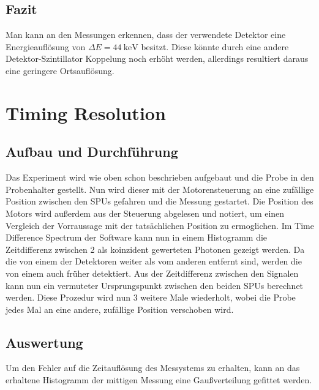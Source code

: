 \documentclass[12pt,twoside,a4paper]{scrartcl}
\begin{document}
\subsection{Fazit}

		Man kann an den Messungen erkennen, dass der verwendete Detektor eine Energieauflösung von $\Delta E = \SI{44}{\kilo \electronvolt}$ besitzt. Diese könnte durch eine andere Detektor-Szintillator Koppelung noch erhöht werden, allerdings resultiert daraus eine geringere Ortsauflösung.

		\section{Timing Resolution}

			\subsection{Aufbau und Durchführung}
				Das Experiment wird wie oben schon beschrieben aufgebaut und die Probe in den Probenhalter gestellt. Nun wird dieser mit der Motorensteuerung an eine zufällige Position zwischen den SPUs gefahren und die Messung gestartet. Die Position des Motors wird außerdem aus der Steuerung abgelesen und notiert, um einen Vergleich der Vorraussage mit der tatsächlichen Position zu ermoglichen. Im Time Difference Spectrum der Software kann nun in einem Histogramm die Zeitdifferenz zwischen 2 als koinzident gewerteten Photonen gezeigt werden. Da die von einem der Detektoren weiter als vom anderen entfernt sind, werden die von einem auch früher detektiert. Aus der Zeitdifferenz zwischen den Signalen kann nun ein vermuteter Ursprungspunkt zwischen den beiden SPUs berechnet werden. Diese Prozedur wird nun 3 weitere Male wiederholt, wobei die Probe jedes Mal an eine andere, zufällige Position verschoben wird.

				\subsection{Auswertung}
					Um den Fehler auf die Zeitauflösung des Messystems zu erhalten, kann an das erhaltene Histogramm der mittigen Messung eine Gaußverteilung gefittet werden.
\end{document}
